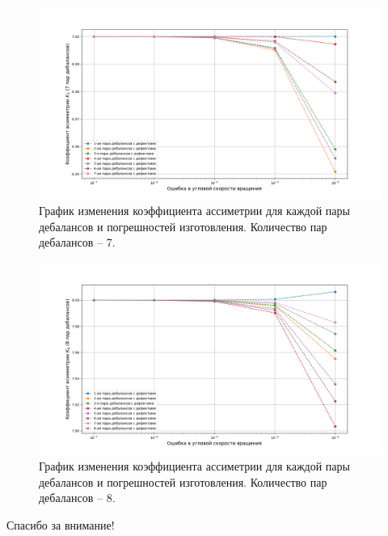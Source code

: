 \documentclass{beamer}
\begin{document}
    \begin{frame}
        \begin{figure}[ht]
            \centering
            \includegraphics[width=1\linewidth]{pairs_with_defects_7}
            \caption{График изменения коэффициента ассиметрии для каждой пары дебалансов и погрешностей изготовления.
            Количество пар дебалансов -- 7.}
            \label{fig:pairs_with_defects_7}
        \end{figure}
    \end{frame}

    \begin{frame}
        \begin{figure}[ht]
            \centering
            \includegraphics[width=1\linewidth]{pairs_with_defects_8}
            \caption{График изменения коэффициента ассиметрии для каждой пары дебалансов и погрешностей изготовления.
            Количество пар дебалансов -- 8.}
            \label{fig:pairs_with_defects_8}
        \end{figure}
    \end{frame}

    \begin{frame}
        \begin{alertblock}{}
            \centerline{\color{darkred}Спасибо за внимание!}
        \end{alertblock}
    \end{frame}
\end{document}
